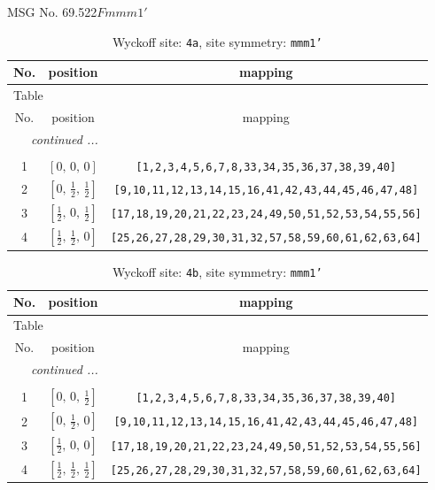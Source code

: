 \documentclass[fleqn,8pt]{jsarticle}
\begin{document}
\setcounter{MaxMatrixCols}{32}

\renewcommand{\tablename}{Table~}
\renewcommand{\figurename}{Figure~}
\begin{center}
\LARGE
MSG No. 69.522\quad$Fmmm1'$
\end{center}
\renewcommand{\arraystretch}{1.2}
\begin{longtable}{ccc}
\caption{Wyckoff site: {\tt 4a}, site symmetry: {\tt mmm1'}}
 \\
 \hline \hline
No. & position & mapping \\ \hline \endfirsthead

\multicolumn{2}{l}{\tablename\ \thetable{}} \\
 \hline \hline
No. & position & mapping \\ \hline \endhead

 \hline \hline
\multicolumn{2}{r}{\footnotesize\it continued ...} \\ \endfoot

 \hline \hline
\multicolumn{2}{r}{} \\ \endlastfoot

1 & $\left[ 0,\, 0,\, 0 \right]$ & {\tt [1,2,3,4,5,6,7,8,33,34,35,36,37,38,39,40]} \\ \hline
2 & $\left[ 0,\, \frac{1}{2},\, \frac{1}{2} \right]$ & {\tt [9,10,11,12,13,14,15,16,41,42,43,44,45,46,47,48]} \\ \hline
3 & $\left[ \frac{1}{2},\, 0,\, \frac{1}{2} \right]$ & {\tt [17,18,19,20,21,22,23,24,49,50,51,52,53,54,55,56]} \\ \hline
4 & $\left[ \frac{1}{2},\, \frac{1}{2},\, 0 \right]$ & {\tt [25,26,27,28,29,30,31,32,57,58,59,60,61,62,63,64]} \\
\end{longtable}
\renewcommand{\arraystretch}{1.2}
\begin{longtable}{ccc}
\caption{Wyckoff site: {\tt 4b}, site symmetry: {\tt mmm1'}}
 \\
 \hline \hline
No. & position & mapping \\ \hline \endfirsthead

\multicolumn{2}{l}{\tablename\ \thetable{}} \\
 \hline \hline
No. & position & mapping \\ \hline \endhead

 \hline \hline
\multicolumn{2}{r}{\footnotesize\it continued ...} \\ \endfoot

 \hline \hline
\multicolumn{2}{r}{} \\ \endlastfoot

1 & $\left[ 0,\, 0,\, \frac{1}{2} \right]$ & {\tt [1,2,3,4,5,6,7,8,33,34,35,36,37,38,39,40]} \\ \hline
2 & $\left[ 0,\, \frac{1}{2},\, 0 \right]$ & {\tt [9,10,11,12,13,14,15,16,41,42,43,44,45,46,47,48]} \\ \hline
3 & $\left[ \frac{1}{2},\, 0,\, 0 \right]$ & {\tt [17,18,19,20,21,22,23,24,49,50,51,52,53,54,55,56]} \\ \hline
4 & $\left[ \frac{1}{2},\, \frac{1}{2},\, \frac{1}{2} \right]$ & {\tt [25,26,27,28,29,30,31,32,57,58,59,60,61,62,63,64]} \\
\end{longtable}
\end{document}
